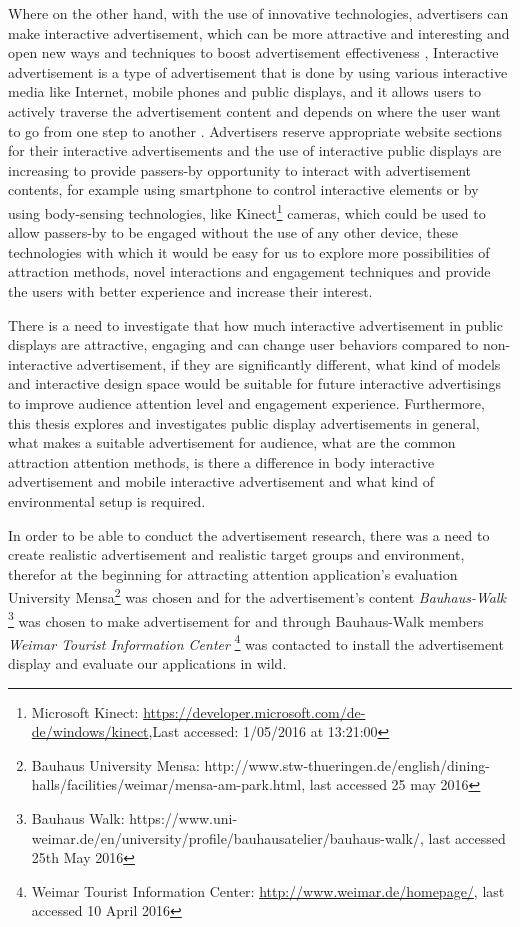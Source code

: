 Where on the other hand, with the use of innovative technologies, advertisers can make interactive advertisement, which can be more attractive and interesting and open new ways and techniques to boost advertisement effectiveness \cite{add_effectivenss}, Interactive advertisement is a type of advertisement that is done by using various interactive media like Internet, mobile phones and public displays, and it allows users to actively traverse the advertisement content and depends on where the user want to go from one step to another \cite{Non_inter_vs_interAd}. Advertisers reserve appropriate website sections for their interactive advertisements and the use of interactive public displays are increasing to provide passers-by opportunity to interact with advertisement contents, for example using smartphone to control interactive elements or by using body-sensing technologies, like Kinect\footnote{Microsoft Kinect: \url{https://developer.microsoft.com/de-de/windows/kinect},Last accessed: 1/05/2016 at 13:21:00} cameras, which could be used to allow passers-by to be engaged without the use of any other device, these technologies with which it would be easy for us to explore more possibilities of attraction methods, novel interactions and engagement techniques and provide the users with better experience and increase their interest. 

There is a need to investigate that how much interactive advertisement in public displays are attractive, engaging and can change user behaviors compared to non-interactive advertisement, if they are significantly different, what kind of models and interactive design space would be suitable for future interactive advertisings to improve audience attention level and engagement experience. Furthermore, this thesis explores and investigates public display advertisements in general, what makes a suitable advertisement for audience, what are the common attraction attention methods, is there a difference in body interactive advertisement and mobile interactive advertisement and what kind of environmental setup is required.

In order to be able to conduct the advertisement research, there was a need to create realistic advertisement and realistic target groups and environment, therefor at the beginning for attracting attention application’s evaluation University Mensa\footnote{Bauhaus University Mensa: http://www.stw-thueringen.de/english/dining-halls/facilities/weimar/mensa-am-park.html, last accessed 25 may 2016} was chosen and for the advertisement’s content \emph{Bauhaus-Walk} \footnote{Bauhaus Walk: https://www.uni-weimar.de/en/university/profile/bauhausatelier/bauhaus-walk/, last accessed 25th May 2016} was chosen to make advertisement for and through Bauhaus-Walk members \emph{Weimar Tourist Information Center} \footnote{Weimar Tourist Information Center: \url{http://www.weimar.de/homepage/}, last accessed 10 April 2016} was contacted to install the advertisement display and evaluate our applications in wild.

